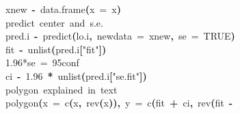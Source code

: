 \documentclass[a4paper]{article}
\newcommand{\hlnumber}[1]{\textcolor[rgb]{0.0823529411764706,0.0784313725490196,0.709803921568627}{#1}}%
\newcommand{\hlfunctioncall}[1]{\textcolor[rgb]{1,0,0}{#1}}%
\newcommand{\hlstring}[1]{\textcolor[rgb]{0.6,0.6,1}{#1}}%
\newcommand{\hlkeyword}[1]{\textcolor[rgb]{0,0,0}{\textbf{#1}}}%
\newcommand{\hlargument}[1]{\textcolor[rgb]{0.694117647058824,0.247058823529412,0.0196078431372549}{#1}}%
\newcommand{\hlcomment}[1]{\textcolor[rgb]{0.8,0.8,0.8}{#1}}%
\newcommand{\hlassignement}[1]{\textcolor[rgb]{0.215686274509804,0.215686274509804,0.384313725490196}{\textbf{#1}}}%
\newcommand{\hlsymbol}[1]{\textcolor[rgb]{0,0,0}{#1}}%
\newcommand{\hlprompt}[1]{\textcolor[rgb]{0,0,0}{#1}}%
\newcommand{\hlstd}[1]{\textcolor[rgb]{0,0,0}{#1}}%
\newenvironment{Houtput}{\raggedright}{%
%
}
\begin{document}
\begin{Houtput}
\hlstd{}\hlprompt{{\ }}{\ }{\ }{\ }{\ }\hlsymbol{xnew}{\ }\hlassignement{\usebox{\hlnormalsizeboxlessthan}-}{\ }\hlfunctioncall{data.frame}\hlkeyword{(}\hlargument{x}{\ }\hlargument{=}{\ }\hlsymbol{x}\hlkeyword{)}\hspace*{\fill}\\
\hlstd{}\hlprompt{{\ }}{\ }{\ }{\ }{\ }\hlcomment{\usebox{\hlnormalsizeboxhash}{\ }predict{\ }center{\ }and{\ }s.e.}\hspace*{\fill}\\
\hlstd{}\hlprompt{{\ }}{\ }{\ }{\ }{\ }\hlsymbol{pred.i}{\ }\hlassignement{\usebox{\hlnormalsizeboxlessthan}-}{\ }\hlfunctioncall{predict}\hlkeyword{(}\hlsymbol{lo.i}\hlkeyword{,}{\ }\hlargument{newdata}{\ }\hlargument{=}{\ }\hlsymbol{xnew}\hlkeyword{,}{\ }\hlargument{se}{\ }\hlargument{=}{\ }\hlnumber{TRUE}\hlkeyword{)}\hspace*{\fill}\\
\hlstd{}\hlprompt{{\ }}{\ }{\ }{\ }{\ }\hlsymbol{fit}{\ }\hlassignement{\usebox{\hlnormalsizeboxlessthan}-}{\ }\hlfunctioncall{unlist}\hlkeyword{(}\hlsymbol{pred.i}\hlkeyword{[}\hlstring{"fit"}\hlkeyword{]}\hlkeyword{)}\hspace*{\fill}\\
\hlstd{}\hlprompt{{\ }}{\ }{\ }{\ }{\ }\hlcomment{\usebox{\hlnormalsizeboxhash}{\ }1.96*se{\ }={\ }95\usebox{\hlnormalsizeboxpercent}{\ }conf}\hspace*{\fill}\\
\hlstd{}\hlprompt{{\ }}{\ }{\ }{\ }{\ }\hlsymbol{ci}{\ }\hlassignement{\usebox{\hlnormalsizeboxlessthan}-}{\ }\hlnumber{1.96}{\ }\hlkeyword{*}{\ }\hlfunctioncall{unlist}\hlkeyword{(}\hlsymbol{pred.i}\hlkeyword{[}\hlstring{"se.fit"}\hlkeyword{]}\hlkeyword{)}\hspace*{\fill}\\
\hlstd{}\hlprompt{{\ }}{\ }{\ }{\ }{\ }\hlcomment{\usebox{\hlnormalsizeboxhash}{\ }polygon{\ }explained{\ }in{\ }text}\hspace*{\fill}\\
\hlstd{}\hlprompt{{\ }}{\ }{\ }{\ }{\ }\hlfunctioncall{polygon}\hlkeyword{(}\hlargument{x}{\ }\hlargument{=}{\ }\hlfunctioncall{c}\hlkeyword{(}\hlsymbol{x}\hlkeyword{,}{\ }\hlfunctioncall{rev}\hlkeyword{(}\hlsymbol{x}\hlkeyword{)}\hlkeyword{)}\hlkeyword{,}{\ }\hlargument{y}{\ }\hlargument{=}{\ }\hlfunctioncall{c}\hlkeyword{(}\hlsymbol{fit}{\ }\hlkeyword{+}{\ }\hlsymbol{ci}\hlkeyword{,}{\ }\hlfunctioncall{rev}\hlkeyword{(}\hlsymbol{fit}{\ }\hlkeyword{-}\hspace*{\fill}\\

\end{Houtput}
\end{document}
